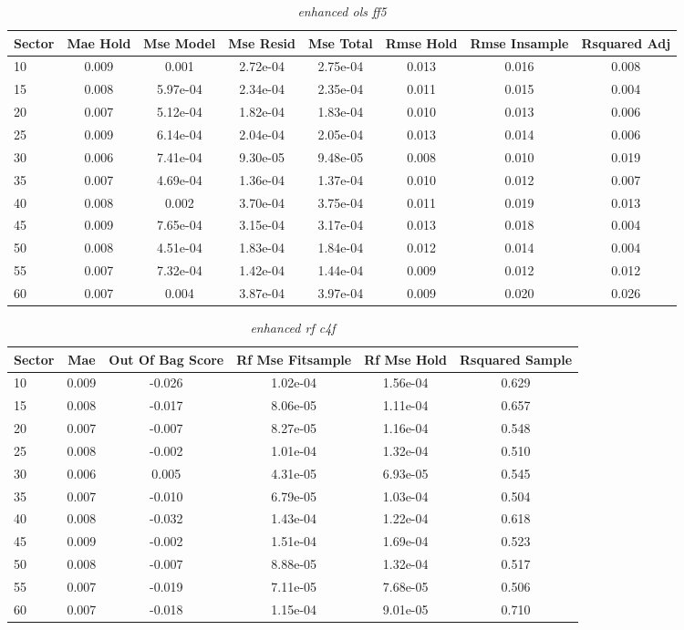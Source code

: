\begin{table}[H]
\caption{\textit{enhanced ols ff5}}\label{tab:enhanced_ols_ff5}
\centering
\begin{tabular}{lccccccc}
\hline\hline
Sector & Mae Hold & Mse Model & Mse Resid & Mse Total & Rmse Hold & Rmse Insample & Rsquared Adj \\ 
\hline
10 & 0.009 & 0.001 & 2.72e-04 & 2.75e-04 & 0.013 & 0.016 & 0.008 \\ 
15 & 0.008 & 5.97e-04 & 2.34e-04 & 2.35e-04 & 0.011 & 0.015 & 0.004 \\ 
20 & 0.007 & 5.12e-04 & 1.82e-04 & 1.83e-04 & 0.010 & 0.013 & 0.006 \\ 
25 & 0.009 & 6.14e-04 & 2.04e-04 & 2.05e-04 & 0.013 & 0.014 & 0.006 \\ 
30 & 0.006 & 7.41e-04 & 9.30e-05 & 9.48e-05 & 0.008 & 0.010 & 0.019 \\ 
35 & 0.007 & 4.69e-04 & 1.36e-04 & 1.37e-04 & 0.010 & 0.012 & 0.007 \\ 
40 & 0.008 & 0.002 & 3.70e-04 & 3.75e-04 & 0.011 & 0.019 & 0.013 \\ 
45 & 0.009 & 7.65e-04 & 3.15e-04 & 3.17e-04 & 0.013 & 0.018 & 0.004 \\ 
50 & 0.008 & 4.51e-04 & 1.83e-04 & 1.84e-04 & 0.012 & 0.014 & 0.004 \\ 
55 & 0.007 & 7.32e-04 & 1.42e-04 & 1.44e-04 & 0.009 & 0.012 & 0.012 \\ 
60 & 0.007 & 0.004 & 3.87e-04 & 3.97e-04 & 0.009 & 0.020 & 0.026 \\ 
\hline
\end{tabular}
\end{table}


\begin{table}[H]
\caption{\textit{enhanced rf c4f}}\label{tab:enhanced_rf_c4f}
\centering
\begin{tabular}{lccccc}
\hline\hline
Sector & Mae & Out Of Bag Score & Rf Mse Fitsample & Rf Mse Hold & Rsquared Sample \\ 
\hline
10 & 0.009 & -0.026 & 1.02e-04 & 1.56e-04 & 0.629 \\ 
15 & 0.008 & -0.017 & 8.06e-05 & 1.11e-04 & 0.657 \\ 
20 & 0.007 & -0.007 & 8.27e-05 & 1.16e-04 & 0.548 \\ 
25 & 0.008 & -0.002 & 1.01e-04 & 1.32e-04 & 0.510 \\ 
30 & 0.006 & 0.005 & 4.31e-05 & 6.93e-05 & 0.545 \\ 
35 & 0.007 & -0.010 & 6.79e-05 & 1.03e-04 & 0.504 \\ 
40 & 0.008 & -0.032 & 1.43e-04 & 1.22e-04 & 0.618 \\ 
45 & 0.009 & -0.002 & 1.51e-04 & 1.69e-04 & 0.523 \\ 
50 & 0.008 & -0.007 & 8.88e-05 & 1.32e-04 & 0.517 \\ 
55 & 0.007 & -0.019 & 7.11e-05 & 7.68e-05 & 0.506 \\ 
60 & 0.007 & -0.018 & 1.15e-04 & 9.01e-05 & 0.710 \\ 
\hline
\end{tabular}
\end{table}


